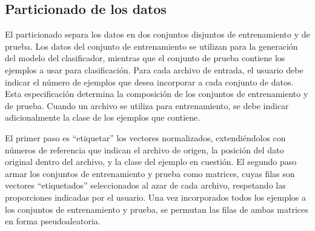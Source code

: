 %
%
%
\subsection{Particionado de los datos}
%
El particionado separa los datos en dos conjuntos disjuntos de
entrenamiento y de prueba.
Los datos del conjunto de entrenamiento se utilizan para la generación
del modelo del clasificador, mientras que el conjunto de prueba
contiene los ejemplos a usar para clasificación.
Para cada archivo de entrada, el usuario debe indicar el número de
ejemplos que desea incorporar a cada conjunto de datos.
Esta especificación determina la composición de los conjuntos de
entrenamiento y de prueba.
Cuando un archivo se utiliza para entrenamiento, se debe indicar
adicionalmente la clase de los ejemplos que contiene.

El primer paso es ``etiquetar'' los vectores normalizados,
extendiéndolos con números de referencia que indican el archivo de
origen, la posición del dato original dentro del archivo, y la clase
del ejemplo en cuestión.
El segundo paso armar los conjuntos de entrenamiento y prueba como
matrices, cuyas filas son vectores ``etiquetados'' seleccionados al
azar de cada archivo, respetando las proporciones indicadas por el
usuario.
Una vez incorporados todos los ejemplos a los conjuntos de
entrenamiento y prueba, se permutan las filas de ambas matrices en
forma pseudoaleatoria.
